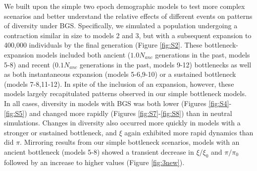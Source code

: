 \documentclass[9pt,twocolumn,twoside]{rilabRxiv}
\begin{document}
We built upon the simple two epoch demographic models  to test more complex  scenarios and better understand the relative effects of different events on patterns of diversity under BGS. 
Specifically,  we simulated a population undergoing a contraction similar in size to models 2 and 3, but with a subsequent expansion to 400,000 individuals by the final generation (Figure \ref{fig:S2}. 
These bottleneck-expansion models included both ancient ($1.0N_{anc}$ generations in the past, models 5-8) and recent ($0.1N_{anc}$ generations in the past, models 9-12) bottlenecks as well as both instantaneous expansion (models 5-6,9-10) or a sustained bottleneck (models 7-8,11-12).
In spite of the inclusion of an expansion, however, these models largely recapitulated patterns observed in our simple bottleneck models.
In all cases, diversity  in models with BGS was both lower (Figures \ref{fig:S4}-\ref{fig:S5}) and changed more rapidly (Figures \ref{fig:S7}-\ref{fig:S8}) than in neutral simulations.
Changes in diversity also occurred more quickly in models with a stronger or sustained bottleneck, and  $\xi$ again exhibited more rapid dynamics than did $\pi$.
Mirroring results from our simple bottleneck scenarios, models with an ancient bottleneck (models 5-8) showed a transient decrease in $\xi/\xi_0$ and $\pi/\pi_0$ followed by an increase to higher values (Figure \ref{fig:3new}).
\end{document}
